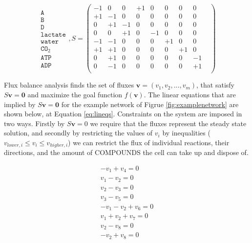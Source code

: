 \documentclass[10pt,a4paper]{article}
\begin{document}
	\begin{equation}
	\begin{matrix}
		\texttt{A}   \\
		\texttt{B}\\
		\texttt{D}\\
		\texttt{lactate}\\
		\texttt{water}\\
		\texttt{CO}_2\\
		\texttt{ATP}\\
		\texttt{ADP}
	\end{matrix}
	,S=
	\begin{pmatrix}
			  -1 &  0 &  0 & +1 &  0 &  0 & 0 & 0 & \\ 
			  +1 & -1 &  0 &  0 &  0 &  0 & 0 &0 &  \\ 
			  0 & +1 & -1 &  0 &  0 &  0 & 0 & 0 & \\ 
			  0  &  0 & +1 &  0 & -1 &  0 & 0 & 0 & \\ 
			  -1 & -1 &  0 &  0 &  0 &+1  & 0 & 0 & \\ 
			  +1 & +1 &  0 &  0 &  0 &  0 & +1&0 &  \\ 
			  0 & +1 &  0 &  0 &  0 & 0 &0 & -1 &\\ 
			  0 & -1 &  0 &  0 &  0 & 0 &0 & +1 & \\ 
			  
		\end{pmatrix} 
		\label{eq:examplematrix}
	\end{equation}


	Flux balance analysis finds the set of fluxes $\mathbf{v}=\left( v_1,v_2,...,v_m \right)$, that satisfy $S\mathbf{v}=\mathbf{0}$ and maximize the goal function $f \left( \mathbf{v} \right)$. The linear equations that are implied by $S\mathbf{v}=\mathbf{0}$ for the example network of Figrue \ref{fig:examplenetwork} are shown below, at Equation \ref{eq:lineqs}. Constraints on the system are imposed in two ways. Firstly by $S\mathbf{v}=0$ we require that the fluxes represent the steady state solution, and secondly by restricting the values of $v_i$ by inequalities ($v_{lower,i}\leq v_i \leq v_{higher,i}$) we can restrict the flux of individual reactions, their directions, and the amount of COMPOUNDS the cell can take up and dispose of. 
	

	\begin{equation}\label{eq:lineqs}
		\begin{matrix}
			- v_1+v_4=0 \\
			v_1-v_2=0 \\
			v_2-v_3=0 \\
			v_3-v_5=0 \\
			-v_1-v_2+v_6=0 \\
			v_1+v_2+v_7=0 \\
			v_2-v_8=0 \\
			-v_2+v_8=0
		\end{matrix}
	\end{equation}
\end{document}
